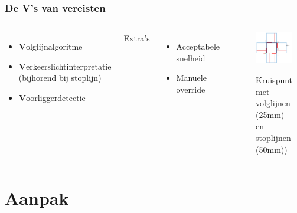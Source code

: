 \documentclass
   [kulak] %
   {kulakbeamer}
\begin{document}
\begin{frame}
\frametitle{De V's van vereisten}
\begin{columns}
	\begin{itemize}
		\item \textbf{V}olglijnalgoritme
		\item \textbf{V}erkeerslichtinterpretatie (bijhorend bij stoplijn)
		\item \textbf{V}oorliggerdetectie

	\end{itemize}
	Extra's
	\begin{itemize}
		\item Acceptabele snelheid
		\item Manuele override
	\end{itemize}
	
		\begin{figure}
			\centering
			\includegraphics[width=.95\textwidth]{volglijnenEnStoplijnen}
			\caption{Kruispunt met volglijnen (25mm) en stoplijnen (50mm))}\cite{OpgavePO2}
		\end{figure}
	
\end{columns}

\end{frame}



\section{Aanpak}
\end{document}
